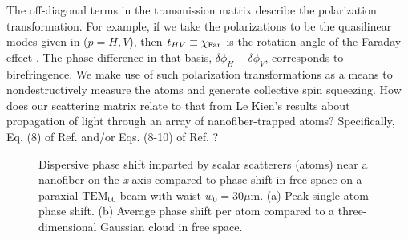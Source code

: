 \documentclass[preprint,aps,pra,onecolumn]{revtex4-1} %
\newcommand{\comment}[1]{{\color{Maroon} #1}}
\begin{document}
The off-diagonal terms in the transmission matrix describe the polarization transformation. For example, if we take the polarizations to be the quasilinear modes given in  ($p = H,V$), then $t_{HV} \equiv \chi_{\rm Far}$ is the rotation angle of the Faraday effect \cite{}.  The phase difference in that basis, $\delta  \phi_H - \delta \phi_V$, corresponds to birefringence.  
We make use of such polarization transformations as a means to nondestructively measure the atoms and generate collective spin squeezing.
\comment{How does our scattering matrix relate to that from Le Kien's results about propagation of light through an array of nanofiber-trapped atoms?  Specifically, Eq. (8) of Ref. \cite{le_kien_correlations_2008} and/or Eqs. (8-10) of Ref. \cite{le_kien_propagation_2014}?  
}
\begin{figure}
\begin{minipage}{.49\linewidth}
\centering
{}
\end{minipage}
\caption{Dispersive phase shift imparted by scalar scatterers (atoms) near a nanofiber on the \emph{x}-axis compared to phase shift in free space on a paraxial $\mathrm{TEM}_{00}$ beam with waist $w_0 = 30 \mu$m. (a) Peak single-atom phase shift. (b) Average phase shift per atom compared to a three-dimensional Gaussian cloud in free space. }\label{Fig::PhaseShift}
\end{figure}
\end{document}

